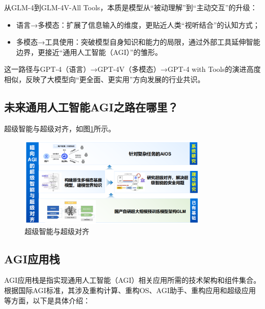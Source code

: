 从GLM-4到GLM-4V-All Tools，本质是模型从“被动理解”到“主动交互”的升级：

\begin{itemize}
	\item 语言→多模态：扩展了信息输入的维度，更贴近人类“视听结合”的认知方式；
	\item 多模态→工具使用：突破模型自身知识和能力的局限，通过外部工具延伸智能边界，更接近“通用人工智能（AGI）”的雏形。
\end{itemize}

这一路径与GPT-4（语言）→GPT-4V（多模态）→GPT-4 with Tools的演进高度相似，反映了大模型向“更全面、更实用”方向发展的行业共识。

\subsection{未来通用人工智能AGI之路在哪里？}

超级智能与超级对齐，如图\ref{fig:superintelligent}所示。

\begin{figure}[H]
	\centering
	\includegraphics[width=0.8\textwidth]{figures/chapter1/fig17.png}
	\caption{超级智能与超级对齐}
	\label{fig:superintelligent}
\end{figure}

\subsection{AGI应用栈}

AGI应用栈是指实现通用人工智能（AGI）相关应用所需的技术架构和组件集合。根据国际AGI标准，其涉及重构计算、重构OS、AGI助手、重构应用和超级应用等方面，以下是具体介绍：

